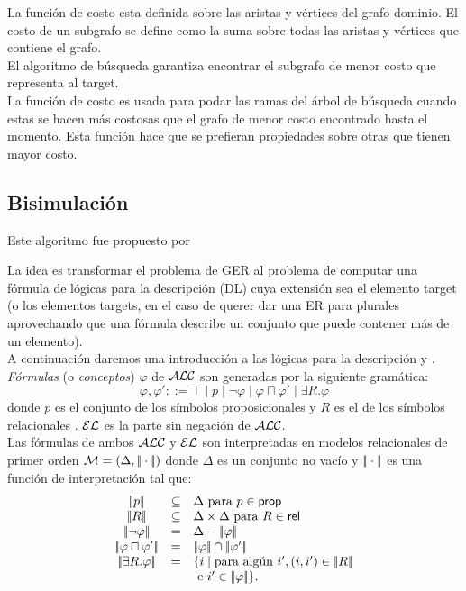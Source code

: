 La funci\'on de costo esta definida sobre las aristas y v\'ertices del grafo dominio. El costo de un subgrafo se define como la suma sobre todas las aristas y v\'ertices que contiene el grafo.\\
El algoritmo de b\'usqueda garantiza encontrar el subgrafo de menor costo que representa al target.\\

La funci\'on de costo es usada para podar las ramas del \'arbol de b\'usqueda cuando estas se hacen m\'as costosas que el grafo de menor costo encontrado hasta el momento. Esta funci\'on hace que se prefieran propiedades sobre otras que tienen mayor costo.

\subsection{Bisimulaci\'on}
\label{bisimulacion}

Este algoritmo fue propuesto por %

La idea es transformar el problema de GER al problema de computar una f\'ormula de l\'ogicas para la descripci\'on (DL) cuya extensi\'on sea el elemento target (o los elementos targets, en el caso de querer dar una ER para plurales aprovechando que una f\'ormula describe un conjunto que puede contener m\'as de un elemento).\\

A continuaci\'on daremos una introducci\'on a las l\'ogicas para la descripci\'on \alc y \el.\\

\emph{F\'ormulas} (o \emph{conceptos}) $\varphi$ de $\mathcal{ALC}$ son generadas por la siguiente gram\'atica:
$$
\varphi,\varphi' ::= \top \mid p \mid \neg \varphi \mid \varphi \sqcap \varphi'
\mid \exists R. \varphi
$$
donde $p$ es el conjunto de los s\'imbolos proposicionales \prop y $R$ es el de los s\'imbolos relacionales \rel. $\mathcal{EL}$ es la parte sin negaci\'on de $\mathcal{ALC}$.\\

Las f\'ormulas de ambos $\mathcal{ALC}$ y $\mathcal{EL}$ son interpretadas en modelos relacionales de primer orden $\mathcal{M} = (\Delta,|\!|\cdot|\!|)$ donde
$\Delta$ es un conjunto no vac\'io y $|\!|\cdot|\!|$ es una funci\'on de interpretaci\'on tal que:
$$
\begin{array}{ccl}
\interp{p} & \subseteq & \Delta  \mbox{ para $p \in \prop$}\\
\interp{R} & \subseteq & \Delta \times \Delta  \mbox{ para $R \in \rel$}\\
\interp{\neg \varphi} & = & \Delta - \interp{\varphi}\\
\interp{\varphi \sqcap \varphi'} & = & \interp{\varphi} \cap \interp{\varphi'}\\
\interp{\exists R.\varphi} & = & \{i \mid \mbox{para alg\'un } i', (i,i') \in \interp{R}\\
& & \mbox{ e } i' \in \interp{\varphi} \}.\\
\end{array}
$$

